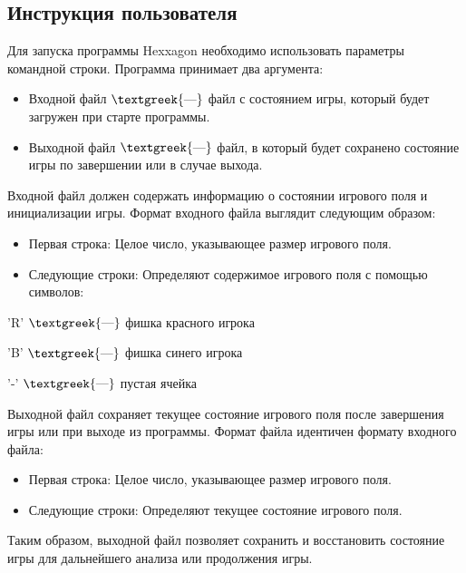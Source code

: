 \documentclass[a4paper]{article}
\begin{document}
\begin{center}
   \section{Инструкция пользователя} 
\end{center}
Для запуска программы {\textquotedbl}Hexxagon{\textquotedbl} необходимо использовать параметры командной строки.
Программа принимает два аргумента:

\begin{itemize}[series=listWWNumxxi,label=$\cdot $]
\item Входной файл $\text{\textgreek{—}}$ файл с состоянием игры, который будет загружен при старте программы.
\item Выходной файл $\text{\textgreek{—}}$ файл, в который будет сохранено состояние игры по завершении или в случае
выхода.
\end{itemize}
Входной файл должен содержать информацию о состоянии игрового поля и инициализации игры. Формат входного файла выглядит
следующим образом:

\begin{itemize}[series=listWWNumxxii,label=$\cdot $]
\item Первая строка: Целое число, указывающее размер игрового поля.
\item Следующие строки: Определяют содержимое игрового поля с помощью символов:
\end{itemize}
{}'R' $\text{\textgreek{—}}$ фишка красного игрока

{}'B' $\text{\textgreek{—}}$ фишка синего игрока

{}'-' $\text{\textgreek{—}}$ пустая ячейка

Выходной файл сохраняет текущее состояние игрового поля после завершения игры или при выходе из программы. Формат файла
идентичен формату входного файла:

\begin{itemize}[series=listWWNumxxiii,label=$\cdot $]
\item Первая строка: Целое число, указывающее размер игрового поля.
\item Следующие строки: Определяют текущее состояние игрового поля.
\end{itemize}
Таким образом, выходной файл позволяет сохранить и восстановить состояние игры для дальнейшего анализа или продолжения
игры.
\vspace{2cm}

\newpage
\end{document}
